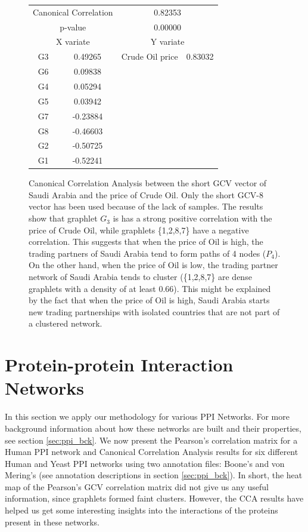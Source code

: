 \begin{figure}[H]
\centering
\begin{tabular}{ c c | c c }
  \multicolumn{2}{c}{Canonical Correlation} &  \multicolumn{2}{c}{0.82353} \\
  \multicolumn{2}{c}{p-value} &  \multicolumn{2}{c}{0.00000} \\
  \hline
  \multicolumn{2}{c}{X variate} & \multicolumn{2}{c}{Y variate}\\
  \hline
 G3 & 0.49265 &  Crude Oil price & 0.83032\\
 G6 & 0.09838 &  & \\
 G4 & 0.05294 &  & \\
 G5 & 0.03942 &  & \\
 G7 & -0.23884 &  & \\
 G8 & -0.46603 &  & \\
 G2 & -0.50725 &  & \\
 G1 & -0.52241 &  & \\
\end{tabular}
\caption[Canonical Correlation Analysis between the short GCV vector of Saudi Arabia and the price of Crude Oil.]{Canonical Correlation Analysis between the short GCV vector of Saudi Arabia and the price of Crude Oil. Only the short GCV-8 vector has been used because of the lack of samples. The results show that graphlet $G_3$ is has a strong positive correlation with the price of Crude Oil, while graphlets \{1,2,8,7\} have a negative correlation. This suggests that when the price of Oil is high, the trading partners of Saudi Arabia tend to form paths of 4 nodes ($P_4$). On the other hand, when the price of Oil is low, the trading partner network of Saudi Arabia tends to cluster (\{1,2,8,7\} are dense graphlets with a density of at least 0.66). This might be explained by the fact that when the price of Oil is high, Saudi Arabia starts new trading partnerships with isolated countries that are not part of a clustered network.}
\label{saudi_oil_cca}
\end{figure}


\section{Protein-protein Interaction Networks}
\label{ppi_res_heatmaps}

In this section we apply our methodology for various PPI Networks. For more background information about how these networks are built and their properties, see section \ref{sec:ppi_bck}. We now present the Pearson's correlation matrix for a Human PPI network and Canonical Correlation Analysis results for six different Human and Yeast PPI networks using two annotation files: Boone's and von Mering's (see annotation descriptions in section \ref{sec:ppi_bck}). In short, the heat map of the Pearson's GCV correlation matrix did not give us any useful information, since graphlets formed faint clusters. However, the CCA results have helped us get some interesting insights into the interactions of the proteins present in these networks. 

